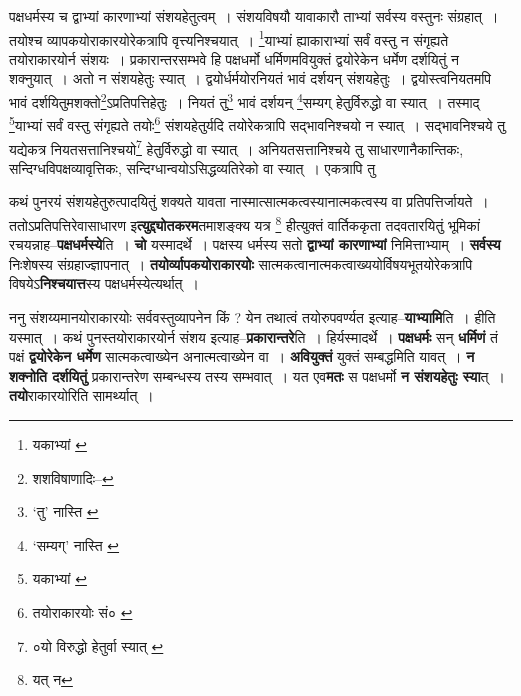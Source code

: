 \documentclass[article,12pt,a4paper]{memoir}
\begin{document}
	  \pstart पक्षधर्मस्य च द्वाभ्यां कारणाभ्यां संशयहेतुत्वम् । संशयविषयौ यावाकारौ ताभ्यां सर्वस्य वस्तुनः संग्रहात् । तयोश्च व्यापकयोराकारयोरेकत्रापि वृत्त्यनिश्चयात् । \footnote{यकाभ्यां \cite{dp-msA} \cite{dp-msB} \cite{dp-msC} \cite{dp-msD} \cite{dp-edP} \cite{dp-edH} \cite{dp-edN}}याभ्यां ह्याकाराभ्यां सर्वं वस्तु न संगृह्यते तयोराकारयोर्न संशयः । प्रकारान्तरसम्भवे हि पक्षधर्मो धर्मिणमवियुक्तं द्वयोरेकेन धर्मेण दर्शयितुं न शक्नुयात् । अतो न संशयहेतुः स्यात् । द्वयोर्धर्मयोरनियतं भावं दर्शयन् संशयहेतुः । द्वयोस्त्वनियतमपि भावं दर्शयितुमशक्तो\footnote{शशविषाणादिः--\cite{dp-msD-n}}ऽप्रतिपत्तिहेतुः । नियतं तु\footnote{‘तु’ नास्ति \cite{dp-msA} \cite{dp-msB} \cite{dp-edP} \cite{dp-edH} \cite{dp-edE} \cite{dp-edN}} भावं दर्शयन् \footnote{‘सम्यग्’ नास्ति \cite{dp-msA} \cite{dp-msB} \cite{dp-edP} \cite{dp-edH} \cite{dp-edE} \cite{dp-edN}}सम्यग् हेतुर्विरुद्धो वा स्यात् । तस्माद् \footnote{यकाभ्यां \cite{dp-msB} \cite{dp-msC} \cite{dp-msD} \cite{dp-edP} \cite{dp-edH} \cite{dp-edN}}याभ्यां सर्वं वस्तु संगृह्यते तयोः\footnote{तयोराकारयोः सं० \cite{dp-msC}} संशयहेतुर्यदि तयोरेकत्रापि सद्भावनिश्चयो न स्यात् । सद्भावनिश्चये तु यद्येकत्र नियतसत्तानिश्चयो\footnote{०यो विरुद्धो हेतुर्वा स्यात् \cite{dp-msA} \cite{dp-msB} \cite{dp-msD} \cite{dp-edP} \cite{dp-edH} \cite{dp-edE} \cite{dp-edN}} हेतुर्विरुद्धो वा स्यात् । अनियतसत्तानिश्चये तु साधारणानैकान्तिकः, सन्दिग्धविपक्षव्यावृत्तिकः, सन्दिग्धान्वयोऽसिद्धव्यतिरेको वा स्यात् । एकत्रापि तु
	\pend
      

	  \pstart कथं पुनरयं संशयहेतुरुत्पादयितुं शक्यते यावता नास्मात्सात्मकत्वस्यानात्मकत्वस्य वा प्रतिपत्तिर्जायते । ततोऽप्रतिपत्तिरेवासाधारण इ\textbf{त्युद्द्योतकरम}तमाशङ्क्य यत्र \footnote{यत् न} हीत्युक्तं वार्तिककृता तदवतारयितुं भूमिकां रचयन्नाह--\textbf{पक्षधर्मस्ये}ति । \textbf{चो} यस्मादर्थे । पक्षस्य धर्मस्य सतो \textbf{द्वाभ्यां कारणाभ्यां} निमित्ताभ्याम् । \textbf{सर्वस्य} निःशेषस्य संग्रहाज्ज्ञापनात् । \textbf{तयोर्व्यापकयोराकारयोः} सात्मकत्वानात्मकत्वाख्ययोर्विषयभूतयोरेकत्रापि विषयेऽ\textbf{निश्चयात्त}स्य पक्षधर्मस्येत्यर्थात् ।
	\pend
      

	  \pstart ननु संशय्यमानयोराकारयोः सर्ववस्तुव्यापनेन किं ? येन तथात्वं तयोरुपवर्ण्यत इत्याह--\textbf{याभ्यामि}ति । हीति यस्मात् । कथं पुनस्तयोराकारयोर्न संशय इत्याह--\textbf{प्रकारान्तरे}ति । हिर्यस्मादर्थे । \textbf{पक्षधर्मः} सन् \textbf{धर्मिणं} तं पक्षं \textbf{द्वयोरेकेन धर्मेण} सात्मकत्वाख्येन अनात्मत्वाख्येन वा । \textbf{अवियुक्तं} युक्तं सम्बद्धमिति यावत् । \textbf{न शक्नोति दर्शयितुं} प्रकारान्तरेण सम्बन्धस्य तस्य सम्भवात् । यत एव\textbf{मतः} स पक्षधर्मो \textbf{न संशयहेतुः स्या}त् । \textbf{तयो}राकारयोरिति सामर्थ्यात् ।
	\pend
      
\end{document}
